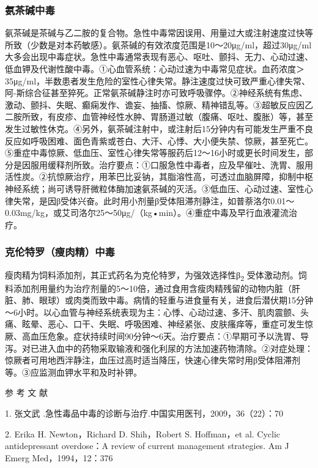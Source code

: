 \subsubsection{氨茶碱中毒}

氨茶碱是茶碱与乙二胺的复合物。急性中毒常因误用、用量过大或注射速度过快等所致（少数是对本药敏感）。氨茶碱的有效浓度范围是10～20μg/ml，超过30μg/ml大多会出现中毒症状。急性中毒通常表现有恶心、呕吐、颤抖、无力、心动过速、低血钾及代谢性酸中毒。①心血管系统：心动过速为中毒常见症状。血药浓度＞
35μg/ml，半数患者发生危险的室性心律失常。静注速度过快可致严重心律失常、阿-斯综合征甚至猝死。正常氨茶碱静注时亦可致呼吸骤停。②神经系统有焦虑、激动、颤抖、失眠、癫痫发作、谵妄、抽搐、惊厥、精神错乱等。③超敏反应因乙二胺所致，有皮疹、血管神经性水肿、胃肠道过敏（腹痛、呕吐、腹胀）等，甚至发生过敏性休克。④另外，氨茶碱注射中，或注射后15分钟内有可能发生严重不良反应如呼吸困难、面色青紫或苍白、大汗、心悸、大小便失禁、惊厥，甚至死亡。⑤重症中毒惊厥、低血压、室性心律失常等服药后12～16小时或更长时间发生，部分是因服用缓释剂所致。治疗要点：①口服急性中毒者，应及早催吐、洗胃、服用活性炭。②抗惊厥治疗，用苯巴比妥钠，其脂溶性高，可透过血脑屏障，抑制中枢神经系统；尚可诱导肝微粒体酶加速氨茶碱的灭活。③低血压、心动过速、室性心律失常，是因β受体兴奋。此时用小剂量β受体阻滞剂静注，如普萘洛尔0.01～0.03mg/kg，或艾司洛尔25～50μg/（kg•min）。④重症中毒及早行血液灌流治疗。

\subsubsection{克伦特罗（瘦肉精）中毒}

瘦肉精为饲料添加剂，其正式药名为克伦特罗，为强效选择性β\textsubscript{2}
受体激动剂。饲料添加剂用量约为治疗剂量的5～10倍，通过食用含瘦肉精残留的动物内脏（肝脏、肺、眼球）或肉类而致中毒。病情的轻重与进食量有关，进食后潜伏期15分钟～6小时。以心血管与神经系统表现为主：心悸、心动过速、多汗、肌肉震颤、头痛、眩晕、恶心、口干、失眠、呼吸困难、神经紧张、皮肤瘙痒等，重症可发生惊厥、高血压危象。症状持续时间90分钟～6天。治疗要点：①早期可予以洗胃、导泻。对已进入血中的药物采取输液和强化利尿的方法加速药物清除。②对症处理：惊厥者可用地西泮静注，血压过高时适当降压，快速心律失常时用β受体阻滞剂等。③应监测血钾水平和及时补钾。

\protect\hypertarget{text00138.html}{}{}

\hypertarget{text00138.htmlux5cux23CHP5-2-8}{}
参 考 文 献

1. 张文武 .急性毒品中毒的诊断与治疗.中国实用医刊，2009，36（22）：70

2. Erika H. Newton，Richard D. Shih，Robert S. Hoffman，et al. Cyclic
antidepressant overdose：A review of current management strategies. Am J
Emerg Med，1994，12：376

